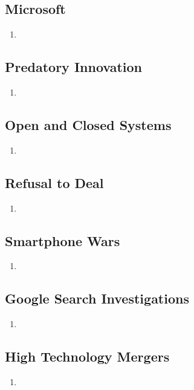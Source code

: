 \subsection{Microsoft} %

\begin{enumerate}
    \item 
\end{enumerate}

\subsection{Predatory Innovation} %

\begin{enumerate}
    \item 
\end{enumerate}

\subsection{Open and Closed Systems} %

\begin{enumerate}
    \item 
\end{enumerate}

\subsection{Refusal to Deal} %

\begin{enumerate}
    \item 
\end{enumerate}

\subsection{Smartphone Wars} %

\begin{enumerate}
    \item 
\end{enumerate}

\subsection{Google Search Investigations} %

\begin{enumerate}
    \item 
\end{enumerate}

\subsection{High Technology Mergers} %

\begin{enumerate}
    \item 
\end{enumerate}
